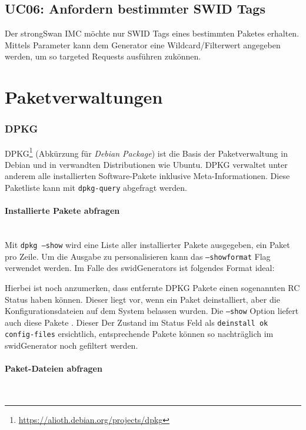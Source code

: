 \subsection{UC06: Anfordern bestimmter SWID Tags}
Der strongSwan IMC möchte nur SWID Tags eines bestimmten Paketes erhalten.
Mittels Parameter kann dem Generator eine Wildcard/Filterwert angegeben werden, um so targeted Requests ausführen zukönnen.


\section{Paketverwaltungen}

\subsubsection{DPKG}

DPKG\footnote{\url{https://alioth.debian.org/projects/dpkg}} (Abkürzung für
\textit{Debian Package}) ist die Basis der Paketverwaltung in Debian und in
verwandten Distributionen wie Ubuntu. DPKG verwaltet unter anderem alle
installierten Software-Pakete inklusive Meta-Informationen. Diese Paketliste
kann mit \texttt{dpkg-query} abgefragt werden.

\paragraph{Installierte Pakete abfragen} \hspace{0pt} \\

\noindent Mit \texttt{dpkg ---show} wird eine Liste aller installierter Pakete
ausgegeben, ein Paket pro Zeile. Um die Ausgabe zu personalisieren kann das
\texttt{---showformat} Flag verwendet werden. Im Falle des swidGenerators
ist folgendes Format ideal:


\noindent Hierbei ist noch anzumerken, dass entfernte DPKG Pakete einen sogenannten RC Status haben können. Dieser liegt vor, wenn ein Paket deinstalliert, aber die Konfigurationsdateien auf dem System belassen wurden. Die \texttt{---show} Option liefert auch diese Pakete . Dieser Der Zustand im Status Feld als \texttt{deinstall ok config-files} ersichtlich, entsprechende Pakete können so nachträglich im swidGenerator noch gefiltert werden.
\paragraph{Paket-Dateien abfragen} \hspace{0pt} \\

